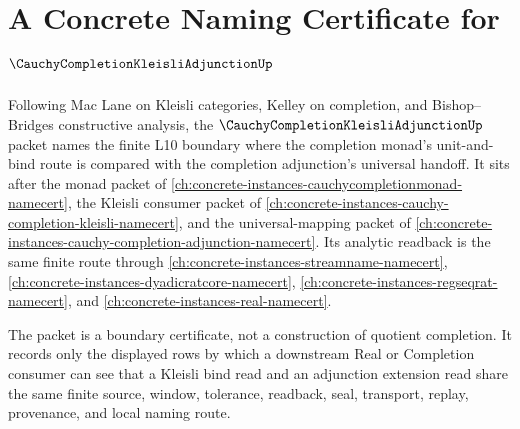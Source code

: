 \chapter{A Concrete Naming Certificate for $\CauchyCompletionKleisliAdjunctionUp$}
\label{ch:concrete-instances-cauchy-completion-kleisli-adjunction-namecert}

Following Mac Lane on Kleisli categories, Kelley on completion, and Bishop--Bridges constructive analysis, the $\CauchyCompletionKleisliAdjunctionUp$ packet names the finite L10 boundary where the completion monad's unit-and-bind route is compared with the completion adjunction's universal handoff. It sits after the monad packet of \autoref{ch:concrete-instances-cauchycompletionmonad-namecert}, the Kleisli consumer packet of \autoref{ch:concrete-instances-cauchy-completion-kleisli-namecert}, and the universal-mapping packet of \autoref{ch:concrete-instances-cauchy-completion-adjunction-namecert}. Its analytic readback is the same finite route through \autoref{ch:concrete-instances-streamname-namecert}, \autoref{ch:concrete-instances-dyadicratcore-namecert}, \autoref{ch:concrete-instances-regseqrat-namecert}, and \autoref{ch:concrete-instances-real-namecert}.

The packet is a boundary certificate, not a construction of quotient completion. It records only the displayed rows by which a downstream Real or Completion consumer can see that a Kleisli bind read and an adjunction extension read share the same finite source, window, tolerance, readback, seal, transport, replay, provenance, and local naming route.

